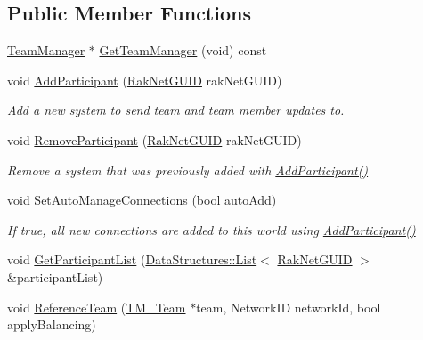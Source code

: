 \subsection*{Public Member Functions}
\begin{DoxyCompactItemize}
\item 
\hyperlink{class_rak_net_1_1_team_manager}{Team\-Manager} $\ast$ \hyperlink{class_rak_net_1_1_t_m___world_a46ee77c66df1ded03e7af23de26d6a21}{Get\-Team\-Manager} (void) const 
\item 
void \hyperlink{class_rak_net_1_1_t_m___world_a75531795fd1adc74d7edae660c4ecc17}{Add\-Participant} (\hyperlink{struct_rak_net_1_1_rak_net_g_u_i_d}{Rak\-Net\-G\-U\-I\-D} rak\-Net\-G\-U\-I\-D)
\begin{DoxyCompactList}\small\item\em Add a new system to send team and team member updates to. \end{DoxyCompactList}\item 
void \hyperlink{class_rak_net_1_1_t_m___world_a044530223e75239d58e9fedac0f955d6}{Remove\-Participant} (\hyperlink{struct_rak_net_1_1_rak_net_g_u_i_d}{Rak\-Net\-G\-U\-I\-D} rak\-Net\-G\-U\-I\-D)
\begin{DoxyCompactList}\small\item\em Remove a system that was previously added with \hyperlink{class_rak_net_1_1_t_m___world_a75531795fd1adc74d7edae660c4ecc17}{Add\-Participant()} \end{DoxyCompactList}\item 
void \hyperlink{class_rak_net_1_1_t_m___world_ac8dcf8b1d3643370b36b4dd01c10e84b}{Set\-Auto\-Manage\-Connections} (bool auto\-Add)
\begin{DoxyCompactList}\small\item\em If true, all new connections are added to this world using \hyperlink{class_rak_net_1_1_t_m___world_a75531795fd1adc74d7edae660c4ecc17}{Add\-Participant()} \end{DoxyCompactList}\item 
void \hyperlink{class_rak_net_1_1_t_m___world_a15d2a091425d1facb24fc16042a8879a}{Get\-Participant\-List} (\hyperlink{class_data_structures_1_1_list}{Data\-Structures\-::\-List}$<$ \hyperlink{struct_rak_net_1_1_rak_net_g_u_i_d}{Rak\-Net\-G\-U\-I\-D} $>$ \&participant\-List)
\item 
void \hyperlink{class_rak_net_1_1_t_m___world_ad6a408626e8bd92a9bdcb3dc8709c581}{Reference\-Team} (\hyperlink{class_rak_net_1_1_t_m___team}{T\-M\-\_\-\-Team} $\ast$team, Network\-I\-D network\-Id, bool apply\-Balancing)

\end{DoxyCompactItemize}
